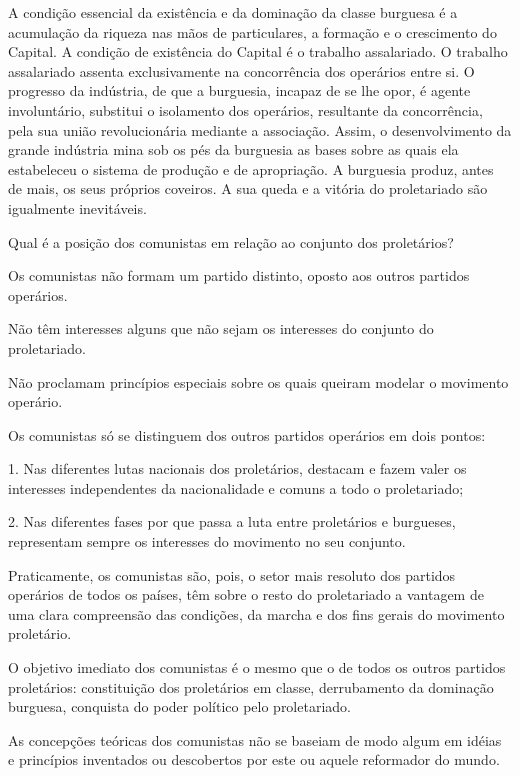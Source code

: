 A condição essencial da existência e da dominação da classe burguesa é
a acumulação da riqueza nas mãos de particulares, a formação e o
crescimento do Capital. A condição de existência do Capital é o
trabalho assalariado. O trabalho assalariado assenta exclusivamente na
concorrência dos operários entre si. O progresso da indústria, de que
a burguesia, incapaz de se lhe opor, é agente involuntário, substitui
o isolamento dos operários, resultante da concorrência, pela sua união
revolucionária mediante a associação. Assim, o desenvolvimento da
grande indústria mina sob os pés da burguesia as bases sobre as quais
ela estabeleceu o sistema de produção e de apropriação. A burguesia
produz, antes de mais, os seus próprios coveiros. A sua queda e a
vitória do proletariado são igualmente inevitáveis.




Qual é a posição dos comunistas em relação ao conjunto dos
proletários?

Os comunistas não formam um partido distinto, oposto aos outros
partidos operários.

Não têm interesses alguns que não sejam os interesses do conjunto do
proletariado.

Não proclamam princípios especiais sobre os quais queiram modelar o
movimento operário.

Os comunistas só se distinguem dos outros partidos operários em dois
pontos:

1. Nas diferentes lutas nacionais dos proletários, destacam e fazem
valer os interesses independentes da nacionalidade e comuns a todo o
proletariado;

2. Nas diferentes fases por que passa a luta entre proletários e
burgueses, representam sempre os interesses do movimento no seu
conjunto.

Praticamente, os comunistas são, pois, o setor mais resoluto dos
partidos operários de todos os países, têm sobre o resto do
proletariado a vantagem de uma clara compreensão das condições, da
marcha e dos fins gerais do movimento proletário.

O objetivo imediato dos comunistas é o mesmo que o de todos os outros
partidos proletários: constituição dos proletários em classe,
derrubamento da dominação burguesa, conquista do poder político pelo
proletariado.

As concepções teóricas dos comunistas não se baseiam de modo algum em
idéias e princípios inventados ou descobertos por este ou aquele
reformador do mundo.

